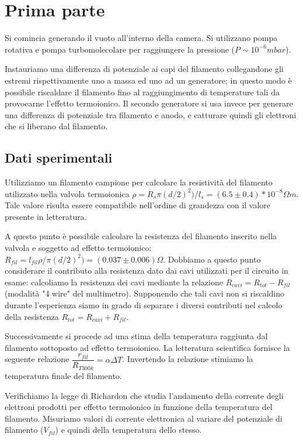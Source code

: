 \documentclass[11pt,a4paper]{article}
\begin{document}
\section{Prima parte}
Si comincia generando il vuoto all'interno della camera. Si utilizzano pompa rotativa e pompa turbomolecolare per raggiungere la pressione ($P\sim10^{-6} mbar$).

Instauriamo una differenza di potenziale ai capi del filamento collegandone gli estremi rispettivamente uno a massa ed uno ad un generatore; in questo modo è possibile riscaldare il filamento fino al raggiungimento di temperature tali da provocarne l'effetto termoionico. Il secondo generatore si usa invece per generare una differenza di potenziale tra filamento e anodo, e catturare quindi gli elettroni che si liberano dal filamento.

\subsection{Dati sperimentali}

Utilizziamo un filamento campione per calcolare la resistività del filamento utilizzato nella valvola termoionica $\rho=R_{s}\pi (d/2)^{2})/l_{s}=(6.5\pm 0.4)*10^{-8} \Omega m$. Tale valore risulta essere compatibile nell'ordine di grandezza con il valore presente in letteratura.

A questo punto è possibile calcolare la resistenza del filamento inserito nella valvola e soggetto ad effetto termoionico: $ R_{fil}=l_{fil}\rho/\pi (d/2)^{2})=(0.037\pm0.006) \Omega$. Dobbiamo a questo punto considerare il contributo alla resistenza dato dai cavi utilizzati per il circuito in esame: calcoliamo la resistenza dei cavi mediante la relazione $R_{cavi}=R_{tot}-R_{fil}$(modalità "4 wire" del multimetro). Supponendo che tali cavi non si riscaldino durante l'esperienza siamo in grado di separare i diversi contributi nel calcolo della resistenza $R_{tot}=R_{cavi}+R_{fil}$.

Successivamente si procede ad una stima della temperatura raggiunta dal filamento sottoposto ad effetto termoionico. La letteratura scientifica fornisce la seguente relazione $\dfrac{r_{fil}}{R_{T300k}}=\alpha \Delta T $. Invertendo la relazione stimiamo la temperatura finale del filamento.

Verifichiamo la legge di Richardon che studia l'andamento della corrente degli elettroni prodotti per effetto termoionico in funzione della temperatura del filamento. Misuriamo valori di corrente elettronica al variare del potenziale di filamento ($V_{fil}$) e quindi della temperatura dello stesso.
\end{document}
